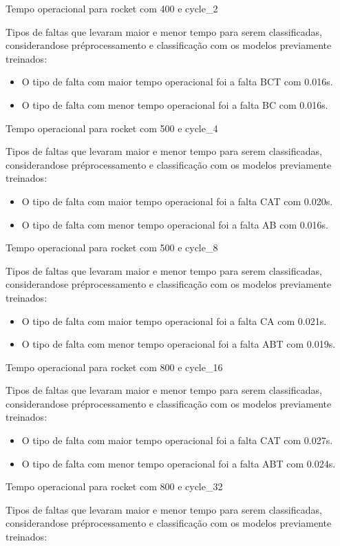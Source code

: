 Tempo operacional para rocket com 400 e cycle_2
\item Tipos de faltas que levaram maior e menor tempo para serem classificadas, considerando\hyph se pré\hyph processamento e classificação com os modelos previamente treinados:
\begin{itemize}
\item O tipo de falta com maior tempo operacional foi a falta BCT com 0.016s.
\item O tipo de falta com menor tempo operacional foi a falta BC com 0.016s.
\end{itemize}
Tempo operacional para rocket com 500 e cycle_4
\item Tipos de faltas que levaram maior e menor tempo para serem classificadas, considerando\hyph se pré\hyph processamento e classificação com os modelos previamente treinados:
\begin{itemize}
\item O tipo de falta com maior tempo operacional foi a falta CAT com 0.020s.
\item O tipo de falta com menor tempo operacional foi a falta AB com 0.016s.
\end{itemize}
Tempo operacional para rocket com 500 e cycle_8
\item Tipos de faltas que levaram maior e menor tempo para serem classificadas, considerando\hyph se pré\hyph processamento e classificação com os modelos previamente treinados:
\begin{itemize}
\item O tipo de falta com maior tempo operacional foi a falta CA com 0.021s.
\item O tipo de falta com menor tempo operacional foi a falta ABT com 0.019s.
\end{itemize}
Tempo operacional para rocket com 800 e cycle_16
\item Tipos de faltas que levaram maior e menor tempo para serem classificadas, considerando\hyph se pré\hyph processamento e classificação com os modelos previamente treinados:
\begin{itemize}
\item O tipo de falta com maior tempo operacional foi a falta CAT com 0.027s.
\item O tipo de falta com menor tempo operacional foi a falta ABT com 0.024s.
\end{itemize}
Tempo operacional para rocket com 800 e cycle_32
\item Tipos de faltas que levaram maior e menor tempo para serem classificadas, considerando\hyph se pré\hyph processamento e classificação com os modelos previamente treinados:
